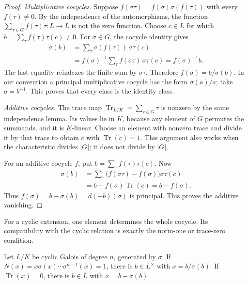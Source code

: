 \begin{proof}
\emph{Multiplicative cocycles.} Suppose
$f(\sigma\tau)=f(\sigma)\sigma(f(\tau))$ with every $f(\tau)\ne0$.
By the independence of the automorphisms, the function
$\sum_{\tau\in G}f(\tau)\tau:L\to L$ is not the zero function. Choose $c\in L$ for which
$b=\sum_\tau f(\tau)\tau(c)\ne0$.
For $\sigma\in G$, the cocycle identity gives
\[
\begin{aligned}
\sigma(b)
 &=\sum_\tau\sigma(f(\tau))\,\sigma\tau(c)\\
 &=f(\sigma)^{-1}\sum_\tau f(\sigma\tau)\,\sigma\tau(c)
 =f(\sigma)^{-1}b.
\end{aligned}
\]
The last equality reindexes the finite sum by $\sigma\tau$. Therefore
$f(\sigma)=b/\sigma(b)$. In our convention a principal multiplicative cocycle has the form $\sigma(a)/a$; take $a=b^{-1}$. This proves that every class is the identity class.

\emph{Additive cocycles.} The trace map
$\operatorname{Tr}_{L/K}=\sum_{\tau\in G}\tau$ is nonzero by the same independence lemma. Its values lie in $K$, because any element of $G$ permutes the summands, and it is $K$-linear. Choose an element with nonzero trace and divide it by that trace to obtain $c$ with $\operatorname{Tr}(c)=1$. This argument also works when the characteristic divides $|G|$; it does not divide by $|G|$.

For an additive cocycle $f$, put
$b=\sum_\tau f(\tau)\tau(c)$. Now
\[
\begin{aligned}
\sigma(b)
 &=\sum_\tau\bigl(f(\sigma\tau)-f(\sigma)\bigr)\sigma\tau(c)\\
 &=b-f(\sigma)\operatorname{Tr}(c)=b-f(\sigma).
\end{aligned}
\]
Thus $f(\sigma)=b-\sigma(b)=d(-b)(\sigma)$ is principal. This proves the additive vanishing.
\end{proof}

For a cyclic extension, one element determines the whole cocycle. Its compatibility with the cyclic relation is exactly the norm-one or trace-zero condition.

\begin{corollary}\label{cor:hilbert90}
Let $L/K$ be cyclic Galois of degree $n$, generated by $\sigma$. If
$N(x)=x\sigma(x)\cdots\sigma^{n-1}(x)=1$, there is $b\in L^\times$ with $x=b/\sigma(b)$. If $\operatorname{Tr}(x)=0$, there is $b\in L$ with $x=b-\sigma(b)$.
\end{corollary}

